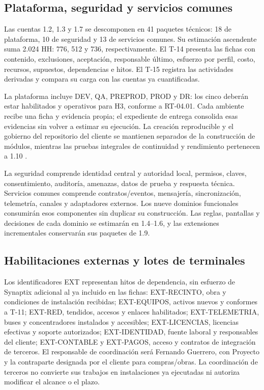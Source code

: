 \subsection{Plataforma, seguridad y servicios comunes}
Las cuentas 1.2, 1.3 y 1.7 se descomponen en 41 paquetes técnicos: 18 de plataforma, 10 de seguridad y 13 de servicios comunes. Su estimación ascendente suma 2.024 HH: 776, 512 y 736, respectivamente. El T-14 presenta las fichas con contenido, exclusiones, aceptación, responsable último, esfuerzo por perfil, costo, recursos, supuestos, dependencias e hitos. El T-15 registra las actividades derivadas y compara su carga con las cuentas ya cuantificadas.

La plataforma incluye DEV, QA, PREPROD, PROD y DR: los cinco deberán estar habilitados y operativos para H3, conforme a RT-04.01. Cada ambiente recibe una ficha y evidencia propia; el expediente de entrega consolida esas evidencias sin volver a estimar su ejecución. La creación reproducible y el gobierno del repositorio del cliente se mantienen separados de la construcción de módulos, mientras las pruebas integrales de continuidad y rendimiento pertenecen a 1.10 \parencite[RT-03.03, RT-04.01; pp.~8--11]{bases-transversales}.

La seguridad comprende identidad central y autoridad local, permisos, claves, consentimiento, auditoría, amenazas, datos de prueba y respuesta técnica. Servicios comunes comprende contratos/eventos, mensajería, sincronización, telemetría, canales y adaptadores externos. Los nueve dominios funcionales consumirán esos componentes sin duplicar su construcción. Las reglas, pantallas y decisiones de cada dominio se estimarán en 1.4--1.6, y las extensiones incrementales conservarán sus paquetes de 1.9.

\subsection{Habilitaciones externas y lotes de terminales}
Los identificadores EXT representan hitos de dependencia, sin esfuerzo de Synaptix adicional al ya incluido en las fichas: EXT-RECINTO, obra y condiciones de instalación recibidas; EXT-EQUIPOS, activos nuevos y conformes a T-11; EXT-RED, tendidos, accesos y enlaces habilitados; EXT-TELEMETRIA, buses y concentradores instalados y accesibles; EXT-LICENCIAS, licencias efectivas y soporte autorizados; EXT-IDENTIDAD, fuente laboral y responsables del cliente; EXT-CONTABLE y EXT-PAGOS, acceso y contratos de integración de terceros. El responsable de coordinación será Fernando Guerrero, con Proyecto y la contraparte designada por el cliente para compras/obras. La coordinación de terceros no convierte sus trabajos en instalaciones ya ejecutadas ni autoriza modificar el alcance o el plazo.

